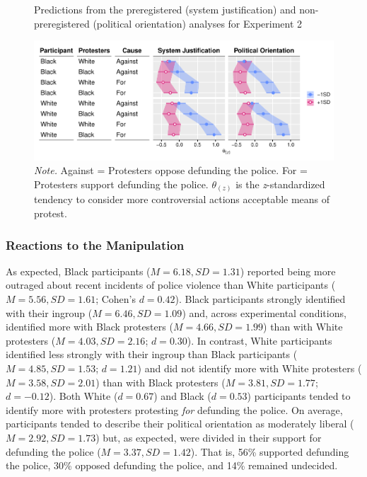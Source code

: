 \documentclass[12pt, letterpaper]{article}
\begin{document}
\begin{figure}[!t]
\centering
\caption{Predictions from the preregistered (system justification) and non-preregistered (political orientation) analyses for Experiment 2}
\includegraphics[scale=1]{../Experiment 2/figures/figure-5}
\caption*{\textit{Note.} Against = Protesters oppose defunding the police. For = Protesters support defunding the police. $\theta_{(z)}$ is the \textit{z}-standardized tendency to consider more controversial actions acceptable means of protest.}
\label{fig:f5}
\end{figure}

\hypertarget{reactions-to-the-manipulation-1}{%
\subsubsection{Reactions to the
Manipulation}\label{reactions-to-the-manipulation-1}}

As expected, Black participants (\(M = 6.18, \textit{SD} = 1.31\))
reported being more outraged about recent incidents of police violence
than White participants (\(M = 5.56, \textit{SD} = 1.61\); Cohen's
\(d = 0.42\)). Black participants strongly identified with their ingroup
(\(M = 6.46, \textit{SD} = 1.09\)) and, across experimental conditions,
identified more with Black protesters (\(M = 4.66, \textit{SD} = 1.99\))
than with White protesters (\(M = 4.03, \textit{SD} = 2.16\);
\(d = 0.30\)). In contrast, White participants identified less strongly
with their ingroup than Black participants
(\(M = 4.85, \textit{SD} = 1.53\); \(d = 1.21\)) and did not identify
more with White protesters (\(M = 3.58, \textit{SD} = 2.01\)) than with
Black protesters (\(M = 3.81, \textit{SD} = 1.77\); \(d = -0.12\)). Both
White (\(d = 0.67\)) and Black (\(d = 0.53\)) participants tended to
identify more with protesters protesting \emph{for} defunding the
police. On average, participants tended to describe their political
orientation as moderately liberal (\(M = 2.92, \textit{SD} = 1.73\))
but, as expected, were divided in their support for defunding the police
(\(M = 3.37, \textit{SD} = 1.42\)). That is, 56\% supported defunding
the police, 30\% opposed defunding the police, and 14\% remained
undecided.
\end{document}
